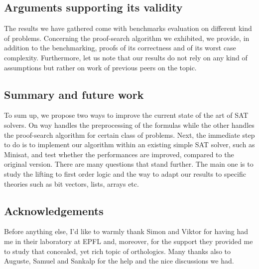 \documentclass[a4paper, 11pt]{article}
\begin{document}
	\subsection*{Arguments supporting its validity}
	The results we have gathered come with benchmarks evaluation on different kind of problems.
	Concerning the proof-search algorithm we exhibited, we provide, in addition to the benchmarking, 
	proofs of its correctness and of its worst case complexity. Furthermore, let us note that our
	results do not rely on any kind of assumptions but rather on work of previous peers on the topic.



	\subsection*{Summary and future work}
	To sum up, we propose two ways to improve the current state of the art of SAT solvers. 
	On way handles the preprocessing of the formulas while the other handles the proof-search
	algorithm for certain class of problems. Next, the immediate step to do is
	to implement our algorithm within an existing simple SAT solver, such as Minisat, and test
	whether the performances are improved, compared to the original version. There are many questions
	that stand further. The main one is to study the lifting to first order logic and the way to 
	adapt our results to specific theories such as bit vectors, lists, arrays etc.


	\subsection*{Acknowledgements}
	Before anything else, I'd like to warmly thank Simon and Viktor for having had me in their 
	laboratory at EPFL and, moreover, for the support they provided me to study that concealed, yet
	rich topic of orthologics. Many thanks also to Auguste, Samuel and Sankalp for the help and 
	the nice discussions we had.

	\newpage
\end{document}

